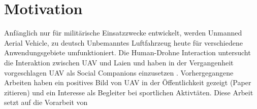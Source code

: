 \section{Motivation}

Anfänglich nur für militärische Einsatzzwecke entwickelt, werden Unmanned Aerial Vehicle, zu deutsch Unbemanntes Luftfahrzeug heute für verschiedene Anwendungsgebiete umfunktioniert.  Die Human-Drohne Interaction untersucht die Interaktion zwischen UAV und Laien und haben in der Vergangenheit vorgeschlagen UAV als Social Companions einzusetzen \cite{Tezza2019StateOfTheArtHumanDroneInter}. Vorhergegangene Arbeiten haben ein positives Bild von UAV in der Öffentlichkeit gezeigt (Paper zitieren) und ein Interesse als Begleiter bei sportlichen Aktivtäten. Diese Arbeit setzt auf die Vorarbeit von 
